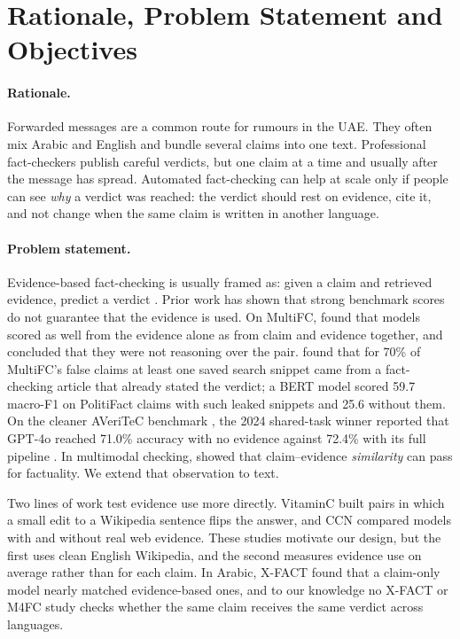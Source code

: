 \section{Rationale, Problem Statement and Objectives}

\paragraph{Rationale.}
Forwarded messages are a common route for rumours in the UAE. They often mix Arabic and English and bundle several claims into one text. Professional fact-checkers publish careful verdicts, but one claim at a time and usually after the message has spread. Automated fact-checking can help at scale only if people can see \emph{why} a verdict was reached: the verdict should rest on evidence, cite it, and not change when the same claim is written in another language.

\paragraph{Problem statement.}
Evidence-based fact-checking is usually framed as: given a claim and retrieved evidence, predict a verdict \citep{thorne2018fever,augenstein2019multifc}. Prior work has shown that strong benchmark scores do not guarantee that the evidence is used. On MultiFC, \citet{hansen2021reason} found that models scored as well from the evidence alone as from claim and evidence together, and concluded that they were not reasoning over the pair. \citet{glockner2022missing} found that for 70\% of MultiFC's false claims at least one saved search snippet came from a fact-checking article that already stated the verdict; a BERT model scored 59.7 macro-F1 on PolitiFact claims with such leaked snippets and 25.6 without them. On the cleaner AVeriTeC benchmark \citep{schlichtkrull2023averitec}, the 2024 shared-task winner reported that GPT-4o reached 71.0\% accuracy with no evidence against 72.4\% with its full pipeline \citep{rothermel2024infact}. In multimodal checking, \citet{papadopoulos2025similarity} showed that claim--evidence \emph{similarity} can pass for factuality. We extend that observation to text.

Two lines of work test evidence use more directly. VitaminC \citep{schuster2021vitaminc} built pairs in which a small edit to a Wikipedia sentence flips the answer, and CCN \citep{abdelnabi2022ccn} compared models with and without real web evidence. These studies motivate our design, but the first uses clean English Wikipedia, and the second measures evidence use on average rather than for each claim. In Arabic, X-FACT \citep{gupta2021xfact} found that a claim-only model nearly matched evidence-based ones, and to our knowledge no X-FACT or M4FC study checks whether the same claim receives the same verdict across languages.


